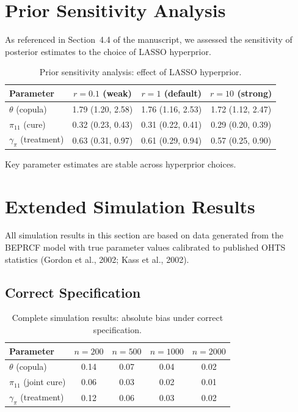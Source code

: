 \documentclass[12pt,a4paper]{article}
\begin{document}
\section{Prior Sensitivity Analysis}

As referenced in Section~4.4 of the manuscript, we assessed the sensitivity of posterior estimates to the choice of LASSO hyperprior.

\begin{table}[H]
\centering
\caption{Prior sensitivity analysis: effect of LASSO hyperprior.}
\label{tab:S4}
\begin{tabular}{lccc}
\toprule
\textbf{Parameter} & $r = 0.1$ (weak) & $r = 1$ (default) & $r = 10$ (strong) \\
\midrule
$\theta$ (copula) & 1.79 (1.20, 2.58) & 1.76 (1.16, 2.53) & 1.72 (1.12, 2.47) \\
$\pi_{11}$ (cure) & 0.32 (0.23, 0.43) & 0.31 (0.22, 0.41) & 0.29 (0.20, 0.39) \\
$\gamma_\pi$ (treatment) & 0.63 (0.31, 0.97) & 0.61 (0.29, 0.94) & 0.57 (0.25, 0.90) \\
\bottomrule
\end{tabular}
\end{table}

Key parameter estimates are stable across hyperprior choices.

\section{Extended Simulation Results}

All simulation results in this section are based on data generated from the BEPRCF model with true parameter values calibrated to published OHTS statistics (Gordon et al., 2002; Kass et al., 2002).

\subsection{Correct Specification}

\begin{table}[H]
\centering
\caption{Complete simulation results: absolute bias under correct specification.}
\label{tab:S5a}
\begin{tabular}{lcccc}
\toprule
\textbf{Parameter} & $n = 200$ & $n = 500$ & $n = 1000$ & $n = 2000$ \\
\midrule
$\theta$ (copula) & 0.14 & 0.07 & 0.04 & 0.02 \\
$\pi_{11}$ (joint cure) & 0.06 & 0.03 & 0.02 & 0.01 \\
$\gamma_\pi$ (treatment) & 0.12 & 0.06 & 0.03 & 0.02 \\
\bottomrule
\end{tabular}
\end{table}
\end{document}
